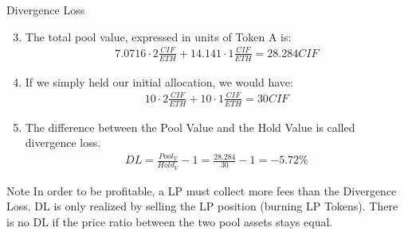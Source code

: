 \documentclass[]{beamer}
\begin{document}
\begin{frame}{Divergence Loss}

	\begin{enumerate}
	\setcounter{enumi}{2}
		\item The total pool value, expressed in units of Token A is: 
			\begin{align*}
				7.0716 \cdot 2 \tfrac{CIF}{ETH} + 14.141 \cdot 1 \tfrac{CIF}{ETH} = 28.284 CIF
			\end{align*}
		\item If we simply held our initial allocation, we would have:
			\begin{align*}
			10 \cdot 2 \tfrac{CIF}{ETH} + 10 \cdot 1 \tfrac{CIF}{ETH} = 	30 CIF
			\end{align*}
		\item The difference between the Pool Value and the Hold Value is called divergence loss.
		\begin{align*}
			DL = \tfrac{Pool_V}{Hold_V} -1 = \tfrac{28.284}{30} - 1 = -5.72 \%
			\end{align*}
	\end{enumerate}	
	
	\begin{keytakeaway}{Note}
		In order to be profitable, a LP must collect more fees than the Divergence Loss. DL is only realized by selling the LP position (burning LP Tokens). There is no DL if the price ratio between the two pool assets stays equal.
	\end{keytakeaway}
	
\end{frame}
\end{document}

